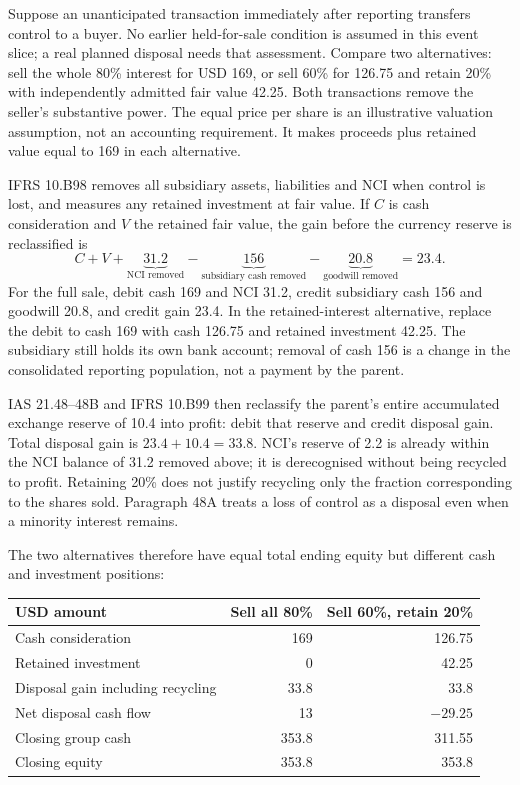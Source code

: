 Suppose an unanticipated transaction immediately after reporting transfers
control to a buyer. No earlier held-for-sale condition is assumed in this
event slice; a real planned disposal needs that assessment. Compare two
alternatives: sell the whole 80\% interest for USD 169, or sell 60\% for
126.75 and retain 20\% with independently admitted fair value 42.25. Both
transactions remove the seller's substantive power. The equal price per
share is an illustrative valuation assumption, not an accounting requirement.
It makes proceeds plus retained value equal to 169 in each alternative.

IFRS 10.B98 removes all subsidiary assets, liabilities and NCI when control
is lost, and measures any retained investment at fair value. If \(C\) is
cash consideration and \(V\) the retained fair value, the gain before the
currency reserve is reclassified is
\[
  C+V+\underbrace{31.2}_{\text{NCI removed}}
      -\underbrace{156}_{\text{subsidiary cash removed}}
      -\underbrace{20.8}_{\text{goodwill removed}}=23.4.
\]
For the full sale, debit cash 169 and NCI 31.2, credit subsidiary cash 156
and goodwill 20.8, and credit gain 23.4. In the retained-interest alternative,
replace the debit to cash 169 with cash 126.75 and retained investment 42.25.
The subsidiary still holds its own bank account; removal of cash 156 is a
change in the consolidated reporting population, not a payment by the parent.

IAS 21.48--48B and IFRS 10.B99 then reclassify the parent's entire accumulated
exchange reserve of 10.4 into profit: debit that reserve and credit disposal
gain. Total disposal gain is \(23.4+10.4=33.8\). NCI's reserve of 2.2
is already within the NCI balance of 31.2 removed above; it is derecognised
without being recycled to profit. Retaining 20\% does not justify recycling
only the fraction corresponding to the shares sold. Paragraph 48A treats a
loss of control as a disposal even when a minority interest remains.

The two alternatives therefore have equal total ending equity but different
cash and investment positions:

\begin{center}
\begin{tabular}{lrr}
\toprule
USD amount & Sell all 80\% & Sell 60\%, retain 20\% \\
\midrule
Cash consideration & 169 & 126.75 \\
Retained investment & 0 & 42.25 \\
Disposal gain including recycling & 33.8 & 33.8 \\
Net disposal cash flow & 13 & $-29.25$ \\
Closing group cash & 353.8 & 311.55 \\
Closing equity & 353.8 & 353.8 \\
\bottomrule
\end{tabular}
\end{center}

